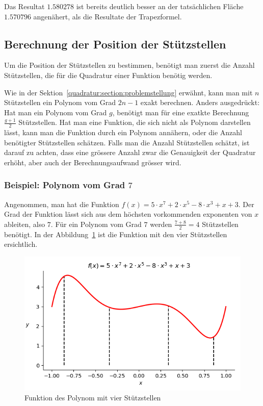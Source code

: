 \noindent
Das Resultat $1.580278$ ist bereits deutlich besser an der tatsächlichen Fläche $1.570796$ 
angenähert, als die Resultate der Trapezformel. 

\subsection{Berechnung der Position der Stützstellen
\label{quadratur:subsection:stützstellenberechnung}}
Um die Position der Stützstellen zu bestimmen, benötigt man zuerst die Anzahl Stützstellen, 
die für die Quadratur einer Funktion benötig werden.

Wie in der Sektion~\ref{quadratur:section:problemstellung} erwähnt, 
kann man mit $n$ Stützstellen ein Polynom vom Grad $2n-1$ exakt berechnen.
Anders ausgedrückt: Hat man ein Polynom vom Grad $g$, 
benötigt man für eine exatkte Berechnung $\frac{g+1}{2}$ Stützstellen.
Hat man eine Funktion, die sich nicht als Polynom darstellen lässt, 
kann man die Funktion durch ein Polynom annähern, 
oder die Anzahl benötigter Stützstellen schätzen.
Falls man die Anzahl Stützstellen schätzt, ist darauf zu achten, 
dass eine grössere Anzahl zwar die Genauigkeit der Quadratur erhöht,
aber auch der Berechnungsaufwand grösser wird.


\subsubsection{Beispiel: Polynom vom Grad $7$}
Angenommen, man hat die Funktion $f(x) = 5 \cdot x^{7} + 2 \cdot x^{5} - 8 \cdot x^{3} + x + 3$.
Der Grad der Funktion lässt sich aus dem höchsten vorkommenden exponenten von $x$ ableiten,
also $7$.
Für ein Polynom vom Grad $7$ werden $\frac{7+8}{2} = 4$ Stützstellen benötigt.
In der Abbildung~\ref{quadratur:figure:polynom} ist die Funktion mit den vier Stützstellen ersichtlich.

\begin{figure}[!h]
    \centering
    \includegraphics[scale=0.7]{papers/quadratur/figures/polynom.png}
    \caption{ Funktion des Polynom mit vier Stützstellen
    \label{quadratur:figure:polynom}}
\end{figure}

